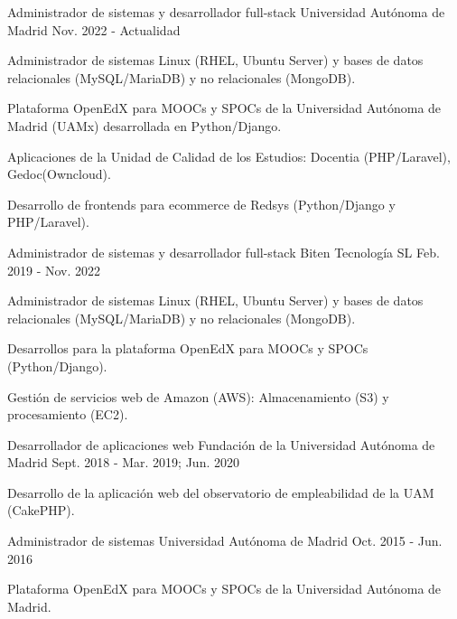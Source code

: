 \begin{cventries}
  \cventry
    {Administrador de sistemas y desarrollador full-stack} %
    {Universidad Autónoma de Madrid} %
    {} %
    {Nov. 2022 - Actualidad} %
    {
      \begin{cvitems} %
        \item{Administrador de sistemas Linux (RHEL, Ubuntu Server) y bases de datos relacionales (MySQL/MariaDB) y no relacionales (MongoDB).}
		\item{Plataforma OpenEdX para MOOCs y SPOCs de la Universidad Autónoma de Madrid (UAMx) desarrollada en Python/Django.}
		\item{Aplicaciones de la Unidad de Calidad de los Estudios: Docentia (PHP/Laravel), Gedoc(Owncloud).}
		\item{Desarrollo de frontends para ecommerce de Redsys (Python/Django y PHP/Laravel).}
      \end{cvitems}
    }

  \cventry
    {Administrador de sistemas y desarrollador full-stack} %
    {Biten Tecnología SL} %
    {} %
    {Feb. 2019 - Nov. 2022} %
    {
    \begin{cvitems}
      \item{Administrador de sistemas Linux (RHEL, Ubuntu Server) y bases de datos relacionales (MySQL/MariaDB) y no relacionales (MongoDB).}
		\item{Desarrollos para la plataforma OpenEdX para MOOCs y SPOCs (Python/Django).}
		\item{Gestión de servicios web de Amazon (AWS): Almacenamiento (S3) y procesamiento (EC2).}
	\end{cvitems}
	}

  \cventry
    {Desarrollador de aplicaciones web} %
    {Fundación de la Universidad Autónoma de Madrid} %
    {} %
    {Sept. 2018 - Mar. 2019; Jun. 2020} %
    {
      \begin{cvitems} %
        \item {Desarrollo de la aplicación web del observatorio de empleabilidad de la UAM (CakePHP).}
      \end{cvitems}
    }

  \cventry
    {Administrador de sistemas} %
    {Universidad Autónoma de Madrid} %
    {} %
    {Oct. 2015 - Jun. 2016} %
    {
      \begin{cvitems} %
        \item {Plataforma OpenEdX para MOOCs y SPOCs de la Universidad Autónoma de Madrid.}
      \end{cvitems}
    }
\end{cventries}


